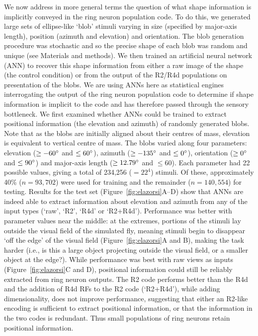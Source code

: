 We now address in more general terms the question of what shape information is implicitly conveyed in the ring neuron population code. To do this, we generated large sets of ellipse-like ‘blob’ stimuli varying in size (specified by major-axis length), position (azimuth and elevation) and orientation. The blob generation procedure was stochastic and so the precise shape of each blob was random and unique (see Materials and methods). We then trained an artificial neural network (ANN) to recover this shape information from either a raw image of the shape (the control condition) or from the output of the R2/R4d populations on presentation of the blobs. We are using ANNs here as statistical engines interrogating the output of the ring neuron population code to determine if shape information is implicit to the code and has therefore passed through the sensory bottleneck. We first examined whether ANNs could be trained to extract positional information (the elevation and azimuth) of randomly generated blobs. Note that as the blobs are initially aligned about their centres of mass, elevation is equivalent to vertical centre of mass. The blobs varied along four parameters: elevation ($\ge -60\degree$ and $\le 60\degree$), azimuth ($\ge -135\degree$ and $\le 0\degree$), orientation ($\ge 0\degree$ and $\le 90\degree$) and major-axis length ($\ge 12.79\degree$ and $\le 60$). Each parameter had 22 possible values, giving a total of 234,256 ($=22^4$) stimuli. Of these, approximately 40\% ($n=93,702$) were used for training and the remainder ($n=140,554$) for testing. Results for the test set (Figure~\ref{fig:elazorsi}A--D) show that ANNs are indeed able to extract information about elevation and azimuth from any of the input types (`raw', `R2', `R4d' or `R2+R4d'). Performance was better with parameter values near the middle: at the extremes, portions of the stimuli lay outside the visual field of the simulated fly, meaning stimuli begin to disappear ‘off the edge’ of the visual field (Figure~\ref{fig:elazorsi}A and B), making the task harder (i.e., is this a large object projecting outside the visual field, or a smaller object at the edge?). While performance was best with raw views as inputs (Figure~\ref{fig:elazorsi}C and D), positional information could still be reliably extracted from ring neuron outputs. The R2 code performs better than the R4d and the addition of R4d RFs to the R2 code (`R2+R4d'), while adding dimensionality, does not improve performance, suggesting that either an R2-like encoding is sufficient to extract positional information, or that the information in the two codes is redundant. Thus small populations of ring neurons retain positional information.

